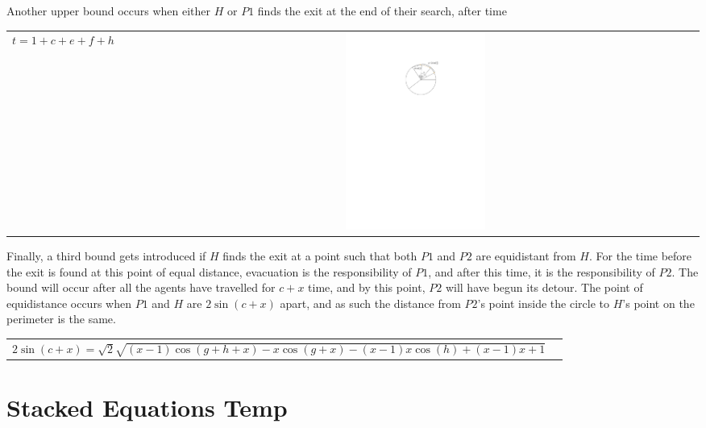 \documentclass[11pt]{article}
\begin{document}
\begin{flushleft}
    Another upper bound occurs when either $H$ or $P1$ finds the exit at the end of
    their search, after time

    \begin{tabularx}{\textwidth}{lXc}
        \multirow{2}{*}{$t = 1+c+e+f+h$} & & \parbox[c]{0.25\textwidth}{\includegraphics[width=0.25\textwidth]{Q2S1_Eq/Q2S1_Old/ub_2.pdf}} \\
    \end{tabularx}

    Finally, a third bound gets introduced if $H$ finds the exit at a point such that both
    $P1$ and $P2$ are equidistant from $H$. For the time before the exit is found at this point of equal
    distance, evacuation is the responsibility of $P1$, and after this time, it is the responsibility
    of $P2$. The bound will occur after all the agents have travelled for $c+x$ time, and by this point,
    $P2$ will have begun its detour. The point of equidistance occurs when $P1$ and $H$ are
    $2\sin(c+x)$ apart, and as such the distance from $P2$'s point inside the circle to $H$'s point on
    the perimeter is the same.

    \begin{tabularx}{\textwidth}{p{}l}
        \multirow{2}{*}{$2\sin(c+x) =
        \sqrt{2}\sqrt{(x-1)\cos(g+h+x) - x\cos(g+x) -
        (x-1)x\cos(h) + (x-1)x + 1}$} & \\
    \end{tabularx}

\end{flushleft}

\section {Stacked Equations Temp}
\end{document}
